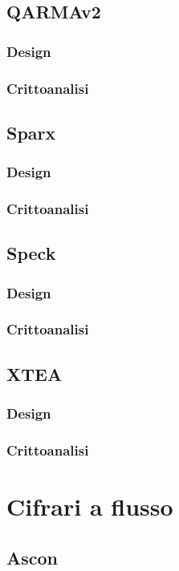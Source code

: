 \documentclass[target=bach,aauheader=,style=]{thud}
\begin{document}
		\subsection{QARMAv2\cite{qarmav2}}
			\subsubsection{Design}
			\subsubsection{Crittoanalisi}
		\subsection{Sparx\cite{sparx}}
			\subsubsection{Design}
			\subsubsection{Crittoanalisi}
		\subsection{Speck\cite{speck}}
			\subsubsection{Design}
			\subsubsection{Crittoanalisi}
		\subsection{XTEA}
			\subsubsection{Design}
			\subsubsection{Crittoanalisi}
	\section{Cifrari a flusso}
		\subsection{Ascon\cite{ascon}}
\end{document}
